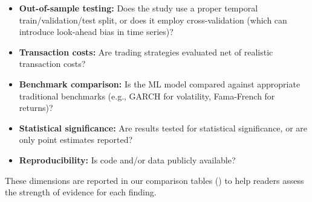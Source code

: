 \begin{itemize}[leftmargin=*]
    \item \textbf{Out-of-sample testing:} Does the study use a proper temporal train/validation/test split, or does it employ cross-validation (which can introduce look-ahead bias in time series)?
    \item \textbf{Transaction costs:} Are trading strategies evaluated net of realistic transaction costs?
    \item \textbf{Benchmark comparison:} Is the ML model compared against appropriate traditional benchmarks (e.g., GARCH for volatility, Fama-French for returns)?
    \item \textbf{Statistical significance:} Are results tested for statistical significance, or are only point estimates reported?
    \item \textbf{Reproducibility:} Is code and/or data publicly available?
\end{itemize}

These dimensions are reported in our comparison tables () to help readers assess the strength of evidence for each finding.
